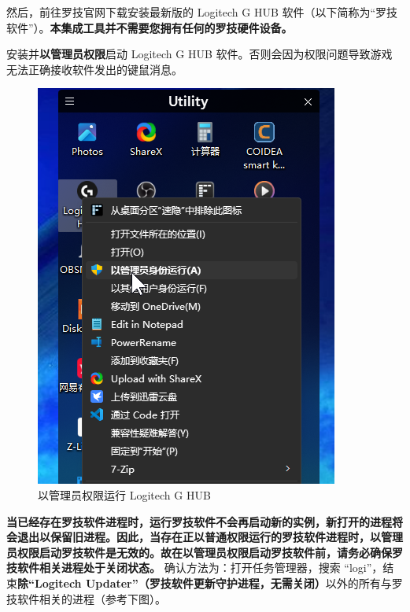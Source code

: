 然后，前往罗技官网下载安装最新版的 Logitech G HUB 软件（以下简称为“罗技软件”）。\textbf{\color{red}本集成工具并不需要您拥有任何的罗技硬件设备。}

安装并\textbf{\color{red}以管理员权限}启动 Logitech G HUB 软件。否则会因为权限问题导致游戏无法正确接收软件发出的键鼠消息。

\begin{figure}[H]
    \Centering
    \includegraphics[width=\textwidth]{docs/assets/run_lghub.png}
    \caption{以管理员权限运行 Logitech G HUB}
\end{figure}

\textbf{\color{red}当已经存在罗技软件进程时，运行罗技软件不会再启动新的实例，新打开的进程将会退出以保留旧进程。因此，当存在正以普通权限运行的罗技软件进程时，以管理员权限启动罗技软件是无效的。故在以管理员权限启动罗技软件前，请务必确保罗技软件相关进程处于关闭状态。}
确认方法为：打开任务管理器，搜索 “logi”，结束\textbf{\color{red}除“Logitech Updater”（罗技软件更新守护进程，无需关闭）}以外的所有与罗技软件相关的进程（参考下图）。

